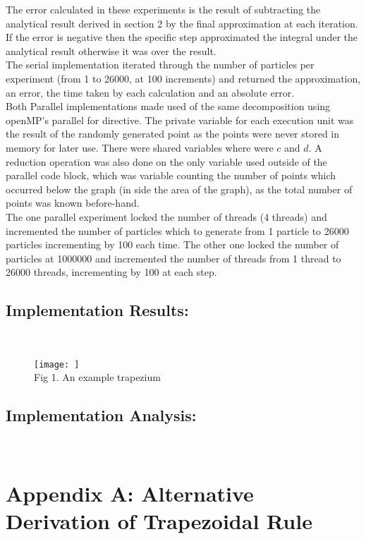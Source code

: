 \documentclass[11pt]{article}
\begin{document}
\begin{page}
\noindent The error calculated in these experiments is the result of subtracting the analytical result derived in section 2 by the final approximation at each iteration. If the error is negative then the specific step approximated the integral under the analytical result otherwise it was over the result.\\

\noindent The serial implementation iterated through the number of particles per experiment (from 1 to 26000, at 100 increments) and returned the approximation, an error, the time taken by each calculation and an absolute error.\\

\noindent Both Parallel implementations made used of the same decomposition using openMP's parallel for directive. The private variable for each execution unit was the result of the randomly generated point as the points were never stored in memory for later use. There were shared variables where were $c$ and $d$. A reduction operation was also done on the only variable used outside of the parallel code block, which was variable counting the number of points which occurred below the graph (in side the area of the graph), as the total number of points was known before-hand.\\

\noindent The one parallel experiment locked the number of threads (4 threads) and incremented the number of particles which to generate from 1 particle to 26000 particles incrementing by 100 each time. The other one locked the number of particles at 1000000 and incremented the number of threads from 1 thread to 26000 threads, incrementing by 100 at each step.


\subsection{Implementation Results:}\\
\begin{figure}[ht]
\centering
     \texttt{[image: ]}\\
     Fig 1. An example trapezium
\end{figure}

\subsection{Implementation Analysis:}\\ 


\break
\section{Appendix A: Alternative Derivation of Trapezoidal Rule}

\end{page}
\end{document}
